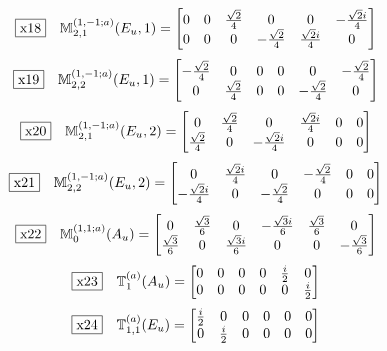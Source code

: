 \documentclass[fleqn,10pt,landscape]{jsarticle}
\begin{document}
\begin{dmath*}
\fbox{x18}\quad \mathbb{M}_{2,1}^{(1,-1;a)}(E_{u},1)=\begin{bmatrix} 0 & 0 & \frac{\sqrt{2}}{4} & 0 & 0 & - \frac{\sqrt{2} i}{4} \\ 0 & 0 & 0 & - \frac{\sqrt{2}}{4} & \frac{\sqrt{2} i}{4} & 0 \end{bmatrix}
\end{dmath*}
\begin{dmath*}
\fbox{x19}\quad \mathbb{M}_{2,2}^{(1,-1;a)}(E_{u},1)=\begin{bmatrix} - \frac{\sqrt{2}}{4} & 0 & 0 & 0 & 0 & - \frac{\sqrt{2}}{4} \\ 0 & \frac{\sqrt{2}}{4} & 0 & 0 & - \frac{\sqrt{2}}{4} & 0 \end{bmatrix}
\end{dmath*}
\begin{dmath*}
\fbox{x20}\quad \mathbb{M}_{2,1}^{(1,-1;a)}(E_{u},2)=\begin{bmatrix} 0 & \frac{\sqrt{2}}{4} & 0 & \frac{\sqrt{2} i}{4} & 0 & 0 \\ \frac{\sqrt{2}}{4} & 0 & - \frac{\sqrt{2} i}{4} & 0 & 0 & 0 \end{bmatrix}
\end{dmath*}
\begin{dmath*}
\fbox{x21}\quad \mathbb{M}_{2,2}^{(1,-1;a)}(E_{u},2)=\begin{bmatrix} 0 & \frac{\sqrt{2} i}{4} & 0 & - \frac{\sqrt{2}}{4} & 0 & 0 \\ - \frac{\sqrt{2} i}{4} & 0 & - \frac{\sqrt{2}}{4} & 0 & 0 & 0 \end{bmatrix}
\end{dmath*}
\begin{dmath*}
\fbox{x22}\quad \mathbb{M}_{0}^{(1,1;a)}(A_{u})=\begin{bmatrix} 0 & \frac{\sqrt{3}}{6} & 0 & - \frac{\sqrt{3} i}{6} & \frac{\sqrt{3}}{6} & 0 \\ \frac{\sqrt{3}}{6} & 0 & \frac{\sqrt{3} i}{6} & 0 & 0 & - \frac{\sqrt{3}}{6} \end{bmatrix}
\end{dmath*}
\begin{dmath*}
\fbox{x23}\quad \mathbb{T}_{1}^{(a)}(A_{u})=\begin{bmatrix} 0 & 0 & 0 & 0 & \frac{i}{2} & 0 \\ 0 & 0 & 0 & 0 & 0 & \frac{i}{2} \end{bmatrix}
\end{dmath*}
\begin{dmath*}
\fbox{x24}\quad \mathbb{T}_{1,1}^{(a)}(E_{u})=\begin{bmatrix} \frac{i}{2} & 0 & 0 & 0 & 0 & 0 \\ 0 & \frac{i}{2} & 0 & 0 & 0 & 0 \end{bmatrix}
\end{dmath*}
\end{document}
